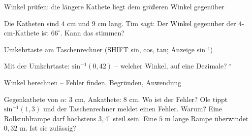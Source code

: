 \begin{aufgabe}{Winkel prüfen: die längere Kathete liegt dem größeren Winkel gegenüber}
\begin{teile}
\teil Die Katheten sind $4$ cm und $9$ cm lang. Tim sagt: Der Winkel gegenüber der $4$-cm-Kathete ist $66^\circ$. Kann das stimmen?
\end{teile}
\end{aufgabe}

\begin{aufgabe}{Umkehrtaste am Taschenrechner (SHIFT sin, cos, tan; Anzeige sin⁻¹)}
\begin{teile}
\teil Mit der Umkehrtaste: $\mathrm{sin}^{-1}(0{,}42)$ – welcher Winkel, auf eine Dezimale? \leerfeld $^\circ$
\end{teile}
\end{aufgabe}

\begin{aufgabe}{Winkel berechnen – Fehler finden, Begründen, Anwendung}
\begin{teile}
\teil Gegenkathete von $\alpha$: $3$ cm, Ankathete: $8$ cm. Wo ist der Fehler? 
\teil Ole tippt $\mathrm{sin}^{-1}(1{,}3)$ und der Taschenrechner meldet einen Fehler. Warum?
\teil Eine Rollstuhlrampe darf höchstens $3{,}4^\circ$ steil sein. Eine $5$ m lange Rampe überwindet $0{,}32$ m. Ist sie zulässig?
\end{teile}
\end{aufgabe}
